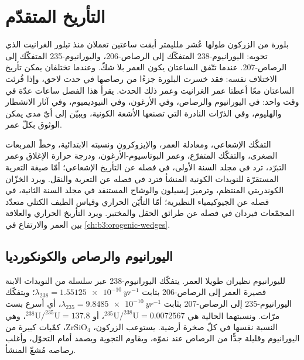 \chapter{التأريخ المتقدّم}\label{ch:b3:advanced-geochronology}

بلورة من الزركون طولها عُشر ملليمتر أبقت ساعتين تعملان منذ تبلور الغرانيت الذي تحويه:
اليورانيوم-238 المتفكّك إلى الرصاص-206، واليورانيوم-235 المتفكّك إلى الرصاص-207.
عندما تتّفق الساعتان يكون العمر بلا شكّ.
وعندما تختلفان يمكن تأريخ الاختلاف نفسه: فقد خسرت البلورة جزءًا من رصاصها في حدث لاحق،
وإذا قُرئت الساعتان معًا أعطتا عمر الغرانيت وعمر ذلك الحدث.
يقرأ هذا الفصل ساعات عدّة في وقت واحد: في اليورانيوم والرصاص، وفي الأرغون، وفي النيوديميوم،
وفي آثار الانشطار والهليوم،
وفي الذرّات النادرة التي تصنعها الأشعة الكونية،
ويبيّن إلى أيّ مدى يمكن الوثوق بكلّ عمر.

\begin{recall}
التفكّك الإشعاعي، ومعادلة العمر، والإيزوكرون ونسبته الابتدائية،
وخطّ المربعات الصغرى، والتفكّك المتفرّع، وعمر البوتاسيوم-الأرغون،
ودرجة حرارة الإغلاق وعمر التبرّد، ترد في مجلد السنة الأولى، في فصله عن
التأريخ الإشعاعي؛ أمّا صيغة التعرية المستقرّة للنويدات الكونية المنشأ فترد
في فصله عن التعرية والنقل. ويرد الخزّان الكوندريتي المنتظم،
وترميز إبسيلون والوشاح المستنفد في مجلد السنة الثانية، في فصله
عن الجيوكيمياء النظيرية؛ أمّا التأيّن الحراري وقياس الطيف الكتلي متعدّد المجمّعات
فيردان في فصله عن طرائق الحقل والمختبر. ويرد التأريخ الحراري
والعلاقة بين العمر والارتفاع في \cref{ch:b3:orogenic-wedges}.
\end{recall}

\section{اليورانيوم والرصاص والكونكورديا}\label{sec:b3:advanced-geochronology:upb}

لليورانيوم نظيران طويلا العمر. يتفكّك اليورانيوم-238 عبر سلسلة من النويدات الابنة قصيرة العمر
إلى الرصاص-206 بثابت $\lambda_{238} =
\qty{1.55125e-10}{yr^{-1}}$؛ ويتفكّك اليورانيوم-235 إلى الرصاص-207 بثابت $\lambda_{235}
= \qty{9.8485e-10}{yr^{-1}}$، أي أسرع بست مرّات. ونسبتهما الحالية هي
$^{235}\mathrm{U}/^{238}\mathrm{U} = 0.0072567$، أو $^{238}\mathrm{U}/^{235}\mathrm{U}
= 137.8$، وهي النسبة نفسها في كلّ صخرة أرضية. يستوعب الزركون، $\mathrm{ZrSiO_4}$،
كمّيات كبيرة من اليورانيوم وقليلة جدًّا من الرصاص عند نموّه، ويقاوم التجوية
ويصمد أمام التحوّل، وأغلب رصاصه مُشعّ المنشأ.

